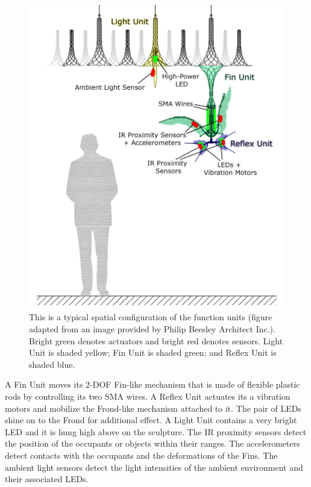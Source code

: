 \begin{figure}[!htbp]
	\centering
	\includegraphics[height=0.85 \textheight]{"fig/interactive control system/Physical hardware"}
	\caption[Typical spatial configuration of the physical functional units]{This is a typical spatial configuration of the function units (figure adapted from an image provided by Philip Beesley Architect Inc.). Bright green denotes actuators and bright red denotes sensors. Light Unit is shaded yellow; Fin Unit is shaded green; and Reflex Unit is shaded blue.}
	\label{fig:Physical hardware}
\end{figure}

A Fin Unit moves its 2-DOF Fin-like mechanism that is made of flexible plastic rods by controlling its two SMA wires. A Reflex Unit actuates its a vibration motors and mobilize the Frond-like mechanism attached to it. The pair of LEDs shine on to the Frond for additional effect. A Light Unit contains a very bright LED and it is hung high above on the sculpture. The IR proximity sensors detect the position of the occupants or objects within their ranges. The accelerometers detect contacts with the occupants and the deformations of the Fins. The ambient light sensors detect the light intensities of the ambient environment and their associated LEDs. 


